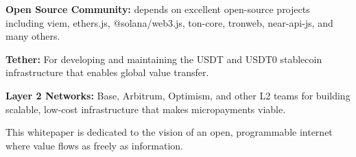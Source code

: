 \documentclass[11pt,a4paper,twoside,openany]{book}
\begin{document}
\textbf{Open Source Community:} \tprotocol{} depends on excellent open-source projects including viem, ethers.js, @solana/web3.js, ton-core, tronweb, near-api-js, and many others.

\textbf{Tether:} For developing and maintaining the USDT and USDT0 stablecoin infrastructure that enables global value transfer.

\textbf{Layer 2 Networks:} Base, Arbitrum, Optimism, and other L2 teams for building scalable, low-cost infrastructure that makes micropayments viable.

\vspace{1em}
\noindent This whitepaper is dedicated to the vision of an open, programmable internet where value flows as freely as information.
\newpage

\tableofcontents

\listoffigures

\listoftables

\mainmatter
























\appendix





\backmatter

{}


\end{document}
